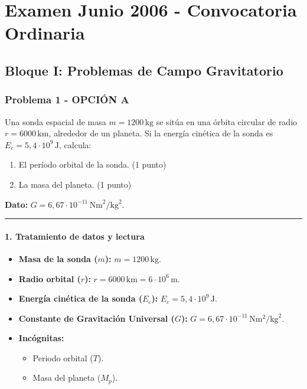 \chapter{Examen Junio 2006 - Convocatoria Ordinaria}
\label{chap:2006_jun_ord}

\section{Bloque I: Problemas de Campo Gravitatorio}
\label{sec:grav_2006_jun_ord}

\subsection{Problema 1 - OPCIÓN A}
\label{subsec:1A_2006_jun_ord}

\begin{cajaenunciado}
Una sonda espacial de masa $m=1200\,\text{kg}$ se sitúa en una órbita circular de radio $r=6000\,\text{km}$, alrededor de un planeta. Si la energía cinética de la sonda es $E_{c}=5,4\cdot10^{9}\,\text{J}$, calcula:
\begin{enumerate}
    \item El período orbital de la sonda. (1 punto)
    \item La masa del planeta. (1 punto)
\end{enumerate}
\textbf{Dato:} $G=6,67\cdot10^{-11}\,\text{Nm}^2/\text{kg}^2$.
\end{cajaenunciado}
\hrule

\subsubsection*{1. Tratamiento de datos y lectura}
\begin{itemize}
    \item \textbf{Masa de la sonda ($m$):} $m = 1200\,\text{kg}$.
    \item \textbf{Radio orbital ($r$):} $r = 6000\,\text{km} = 6 \cdot 10^6\,\text{m}$.
    \item \textbf{Energía cinética de la sonda ($E_c$):} $E_c = 5,4 \cdot 10^9\,\text{J}$.
    \item \textbf{Constante de Gravitación Universal ($G$):} $G = 6,67 \cdot 10^{-11}\,\text{N}\text{m}^2/\text{kg}^2$.
    \item \textbf{Incógnitas:}
    \begin{itemize}
        \item Periodo orbital ($T$).
        \item Masa del planeta ($M_p$).
    \end{itemize}
\end{itemize}

